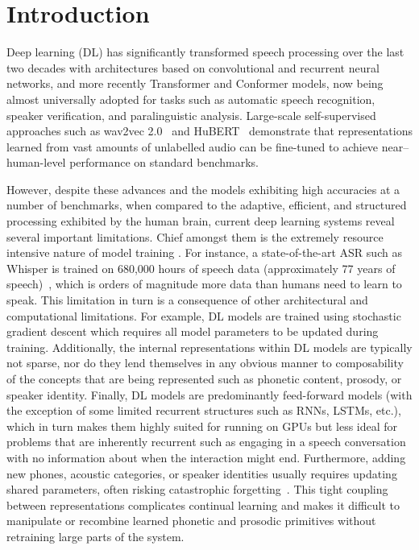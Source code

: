 \section{Introduction}
Deep learning (DL) has significantly transformed speech processing over the last two decades with architectures based on convolutional and recurrent neural networks, and more recently Transformer and Conformer models, now being almost universally adopted for tasks such as automatic speech recognition, speaker verification, and paralinguistic analysis. Large-scale self-supervised approaches such as wav2vec 2.0~\cite{baevskiWav2vec20Framework2020} and HuBERT~\cite{hsuHuBERTSelfSupervisedSpeech2021} demonstrate that representations learned from vast amounts of unlabelled audio can be fine-tuned to achieve near–human-level performance on standard benchmarks. 

However, despite these advances and the models exhibiting high accuracies at a number of benchmarks, when compared to the adaptive, efficient, and structured processing exhibited by the human brain, current deep learning systems reveal several important limitations. Chief amongst them is the extremely resource intensive nature of model training . For instance, a state-of-the-art ASR such as Whisper is trained on 680,000 hours of speech data (approximately 77 years of speech)~\cite{radford_robust_2022}, which is orders of magnitude more data than humans need to learn to speak. This limitation in turn is a consequence of other architectural and computational limitations. For example, DL models are trained using stochastic gradient descent which requires all model parameters to be updated during training.
Additionally, the internal representations within DL models are typically not sparse, nor do they lend themselves in any obvious manner to composability of the concepts that are being represented such as phonetic content, prosody, or speaker identity. Finally, DL models are predominantly feed-forward models (with the exception of some limited recurrent structures such as RNNs, LSTMs, etc.), which in turn makes them highly suited for running on GPUs but less ideal for problems that are inherently recurrent such as engaging in a speech conversation with no information about when the interaction might end. Furthermore, adding new phones, acoustic categories, or speaker identities usually requires updating shared parameters, often risking catastrophic forgetting~\cite{Kemker_McClure_Abitino_Hayes_Kanan_2018}. This tight coupling between representations complicates continual learning and makes it difficult to manipulate or recombine learned phonetic and prosodic primitives without retraining large parts of the system. %

